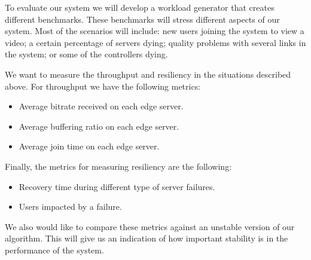 To evaluate our system we will develop a workload generator that creates different benchmarks. These benchmarks will stress different aspects of our system. Most of the scenarios will include: new users joining the system to view a video; a certain percentage of servers dying; quality problems with several links in the system; or some of the controllers dying.

We want to measure the throughput and resiliency in the situations described above. For throughput we have the following metrics:

\begin{itemize}
\item Average bitrate received on each edge server.
\item Average buffering ratio on each edge server.
\item Average join time on each edge server.
\end{itemize}

Finally, the metrics for measuring resiliency are the following:

\begin{itemize}
\item Recovery time during different type of server failures.
\item Users impacted by a failure.
\end{itemize}

We also would like to compare these metrics against an unstable version of our algorithm. This will give us an indication of how important stability is in the performance of the system.
